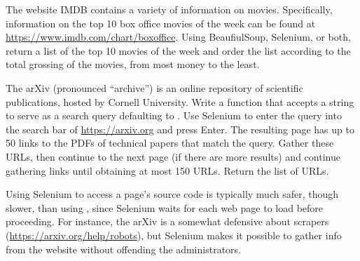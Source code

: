 \begin{problem}
The website IMDB contains a variety of information on movies.
Specifically, information on the top 10 box office movies of the week can be found at \url{https://www.imdb.com/chart/boxoffice}.
Using BeaufiulSoup, Selenium, or both, return a list of the top 10 movies of the week and order the list according to the total grossing of the movies, from most money to the least.
\end{problem}

\begin{problem} %
The arXiv (pronounced ``archive'') is an online repository of scientific publications, hosted by Cornell University.
Write a function that accepts a string to serve as a search query defaulting to .
Use Selenium to enter the query into the search bar of \url{https://arxiv.org} and press Enter.
The resulting page has up to 50 links to the PDFs of technical papers that match the query.
Gather these URLs, then continue to the next page (if there are more results) and continue gathering links until obtaining at most 150 URLs.
Return the list of URLs.
\end{problem}

\begin{info}
Using Selenium to access a page's source code is typically much safer, though slower, than using , since Selenium waits for each web page to load before proceeding.
For instance, the arXiv is a somewhat defensive about scrapers (\url{https://arxiv.org/help/robots}), but Selenium makes it possible to gather info from the website without offending the administrators.
\end{info}

\begin{comment} %
\begin{problem}
The NBA has live statistics \url{http://stats.nba.com/}.
Use Selenium to return a list of the \li{a} tags containing each of the 30 NBA teams.
Use the \li{find_all()} method in conjunction with whatever unique identifiers get you the correct tags.
\\(Hint: class and tag name are a good start). %

\begin{itemize}
\item The column titles are Name, HW\%, AW\%, where Name is each team name, HW\% is the Home Win \%, and AW\% is the Away Win \%.
\item Each row represents a different basketball team, with its home and away win percentages.
\end{itemize}
Hint: You will need to use Selenium to access each teams website using the links from the tags found in problem \ref{prob:scraping-bball}.
If the websites do not load properly, consider a \li{try-except} clause like the one suggested previously.
\end{problem}
\end{comment}

